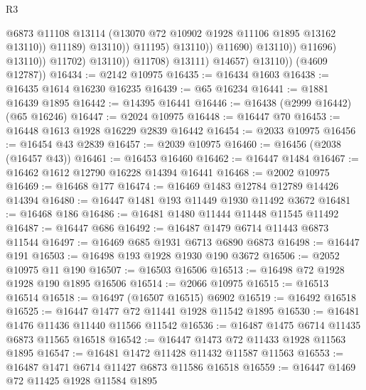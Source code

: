 \begin{lexlean}{R3}
\begin{coremodule}
                                                @6873
                                                @11108
                                                @13114
                                                (@13070
                                                  @72
                                                  @10902
                                                  @1928
                                                  @11106
                                                  @1895
                                                  @13162
                                                  @13110))
                                              @11189)
                                            @13110))
                                        @11195)
                                      @13110))
                                  @11690)
                                @13110))
                            @11696)
                          @13110))
                      @11702)
                    @13110))
                @11708)
              @13111)
            @14657)
          @13110))
      (@4609 @12787))
@16434 := @2142 @10975
@16435 := @16434 @1603
@16438 := @16435 @1614 @16230 @16235
@16439 := @65 @16234
@16441 := @1881 @16439 @1895
@16442 := @14395 @16441
@16446 := @16438 (@2999 @16442) (@65 @16246)
@16447 := @2024 @10975
@16448 := @16447 @70
@16453 := @16448 @1613 @1928 @16229 @2839 @16442
@16454 := @2033 @10975
@16456 := @16454 @43 @2839
@16457 := @2039 @10975
@16460 := @16456 (@2038 (@16457 @43))
@16461 := @16453 @16460
@16462 := @16447 @1484
@16467 := @16462 @1612 @12790 @16228 @14394 @16441
@16468 := @2002 @10975
@16469 := @16468 @177
@16474 := @16469 @1483 @12784 @12789 @14426 @14394
@16480 := @16447 @1481 @193 @11449 @1930 @11492 @3672
@16481 := @16468 @186
@16486 := @16481 @1480 @11444 @11448 @11545 @11492
@16487 := @16447 @686
@16492 := @16487 @1479 @6714 @11443 @6873 @11544
@16497 := @16469 @685 @1931 @6713 @6890 @6873
@16498 := @16447 @191
@16503 := @16498 @193 @1928 @1930 @190 @3672
@16506 := @2052 @10975 @11 @190
@16507 := @16503 @16506
@16513 := @16498 @72 @1928 @1928 @190 @1895 @16506
@16514 := @2066 @10975
@16515 := @16513 @16514
@16518 := @16497 (@16507 @16515) @6902
@16519 := @16492 @16518
@16525 := @16447 @1477 @72 @11441 @1928 @11542 @1895
@16530 := @16481 @1476 @11436 @11440 @11566 @11542
@16536 := @16487 @1475 @6714 @11435 @6873 @11565 @16518
@16542 := @16447 @1473 @72 @11433 @1928 @11563 @1895
@16547 := @16481 @1472 @11428 @11432 @11587 @11563
@16553 := @16487 @1471 @6714 @11427 @6873 @11586 @16518
@16559 := @16447 @1469 @72 @11425 @1928 @11584 @1895

\end{coremodule}
\end{lexlean}
